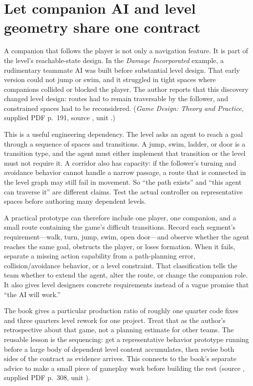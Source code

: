 \section{Let companion AI and level geometry share one contract}\label{06-engine-ii-ch047-let-companion-ai-and-level-geometry-share-one-contract}

\hypertarget{06-engine-ii-ch047-let-companion-ai-and-level-geometry-share-one-contract}{}

A companion that follows the player is not only a navigation feature. It is part of the level's reachable-state design. In the \emph{Damage Incorporated} example, a rudimentary teammate AI was built before substantial level design. That early version could not jump or swim, and it struggled in tight spaces where companions collided or blocked the player. The author reports that this discovery changed level design: routes had to remain traversable by the follower, and constrained spaces had to be reconsidered. (\emph{Game Design: Theory and Practice}, supplied PDF p.~191, source , unit .)

This is a useful engineering dependency. The level asks an agent to reach a goal through a sequence of spaces and transitions. A jump, swim, ladder, or door is a transition type, and the agent must either implement that transition or the level must not require it. A corridor also has capacity: if the follower's turning and avoidance behavior cannot handle a narrow passage, a route that is connected in the level graph may still fail in movement. So ``the path exists'' and ``this agent can traverse it'' are different claims. Test the actual controller on representative spaces before authoring many dependent levels.

A practical prototype can therefore include one player, one companion, and a small route containing the game's difficult transitions. Record each segment's requirement---walk, turn, jump, swim, open door---and observe whether the agent reaches the same goal, obstructs the player, or loses formation. When it fails, separate a missing action capability from a path-planning error, collision/avoidance behavior, or a level constraint. That classification tells the team whether to extend the agent, alter the route, or change the companion role. It also gives level designers concrete requirements instead of a vague promise that ``the AI will work.''

The book gives a particular production ratio of roughly one quarter code fixes and three quarters level rework for one project. Treat that as the author's retrospective about that game, not a planning estimate for other teams. The reusable lesson is the sequencing: get a representative behavior prototype running before a large body of dependent level content accumulates, then revise both sides of the contract as evidence arrives. This connects to the book's separate advice to make a small piece of gameplay work before building the rest (source , supplied PDF p.~308, unit ).

